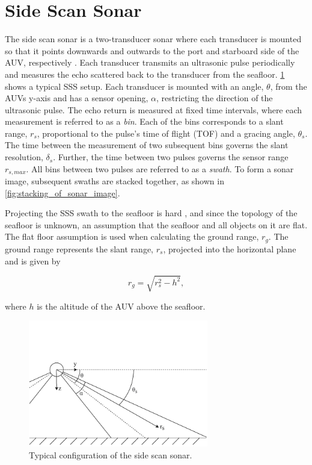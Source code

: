 \section{Side Scan Sonar}

The side scan sonar is a two-transducer sonar where each transducer is mounted so that it points downwards and outwards to the port and starboard side of the AUV, respectively \cite{Burguera2016High-ResolutionSonar}. Each transducer transmits an ultrasonic pulse periodically and measures the echo scattered back to the transducer from the seafloor. \cref{fig:sss} shows a typical SSS setup. Each transducer is mounted with an angle, $\theta$, from the AUVs y-axis and has a sensor opening, $\alpha$, restricting the direction of the ultrasonic pulse. The echo return is measured at fixed time intervals, where each measurement is referred to as a \textit{bin}. Each of the bins corresponds to a slant range, $r_s$, proportional to the pulse's time of flight (TOF) and a gracing angle, $\theta_s$. The time between the measurement of two subsequent bins governs the slant resolution, $\delta_s$. Further, the time between two pulses governs the sensor range $r_{s, max}$. All bins between two pulses are referred to as a \textit{swath}. To form a sonar image, subsequent swaths are stacked together, as shown in \cref{fig:stacking_of_sonar_image}. 

Projecting the SSS swath to the seafloor is hard \cite{Coiras2007MultiresolutionImages}, and since the topology of the seafloor is unknown, an assumption that the seafloor and all objects on it are flat. The flat floor assumption is used when calculating the ground range, $r_g$. The ground range represents the slant range, $r_s$, projected into the horizontal plane and is given by

\begin{equation}
    r_g = \sqrt{r_s^2 - h^2},
    \label{eq:ground_range}
\end{equation}

where $h$ is the altitude of the AUV above the seafloor.

\hspace{1cm}

\begin{figure}[h]
    \centering
    \includegraphics[trim=0cm 0cm 0cm 3.1cm, clip=true, width=0.7\textwidth]{figures/sss.drawio.pdf}
    \caption{Typical configuration of the side scan sonar.}
    \label{fig:sss}
\end{figure}

